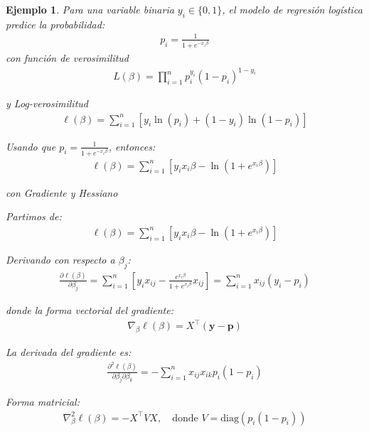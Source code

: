 \documentclass[12pt]{article}
\newtheorem{Ejem}{Ejemplo}%
\begin{document}
\begin{Ejem}
Para una variable binaria $y_i \in \{0,1\}$, el modelo de regresión logística predice la probabilidad:
\begin{eqnarray*}
    p_i = \frac{1}{1 + e^{-x_i \beta}}
\end{eqnarray*}
con funci\'on de verosimilitud
\begin{eqnarray*}
    L(\beta) = \prod_{i=1}^n p_i^{y_i} (1 - p_i)^{1 - y_i}
\end{eqnarray*}

y Log-verosimilitud
\begin{eqnarray*}
\ell(\beta) = \sum_{i=1}^n \left[ y_i \ln(p_i) + (1 - y_i) \ln(1 - p_i) \right]
\end{eqnarray*}

Usando que $p_i = \frac{1}{1 + e^{-x_i \beta}}$, entonces:
\begin{eqnarray*}
    \ell(\beta) = \sum_{i=1}^n \left[ y_i x_i \beta - \ln(1 + e^{x_i \beta}) \right]
\end{eqnarray*}

con  Gradiente y Hessiano

Partimos de:
\begin{eqnarray*}
    \ell(\beta) = \sum_{i=1}^n \left[ y_i x_i \beta - \ln(1 + e^{x_i \beta}) \right]
\end{eqnarray*}

Derivando con respecto a $\beta_j$:
\begin{eqnarray*}
    \frac{\partial \ell(\beta)}{\partial \beta_j} = \sum_{i=1}^n \left[ y_i x_{ij} - \frac{e^{x_i \beta}}{1 + e^{x_i \beta}} x_{ij} \right] = \sum_{i=1}^n x_{ij}(y_i - p_i)
\end{eqnarray*}

donde la forma vectorial del gradiente:
\begin{eqnarray*}
    \nabla_\beta \ell(\beta) = X^\top (\mathbf{y} - \mathbf{p})
\end{eqnarray*}

La derivada del gradiente es:
\begin{eqnarray*}
    \frac{\partial^2 \ell(\beta)}{\partial \beta_j \partial \beta_k} = - \sum_{i=1}^n x_{ij} x_{ik} p_i (1 - p_i)
\end{eqnarray*}

Forma matricial:
\begin{eqnarray*}
    \nabla^2_\beta \ell(\beta) = - X^\top V X, \quad \text{donde } V = \text{diag}(p_i (1 - p_i))
\end{eqnarray*} 



\end{Ejem}
\end{document}
